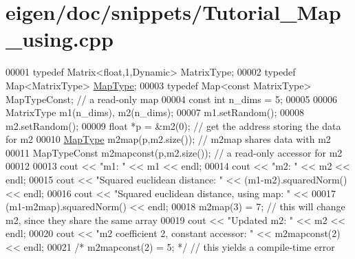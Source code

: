 \hypertarget{eigen_2doc_2snippets_2_tutorial___map__using_8cpp_source}{}\section{eigen/doc/snippets/\+Tutorial\+\_\+\+Map\+\_\+using.cpp}
\label{eigen_2doc_2snippets_2_tutorial___map__using_8cpp_source}

\begin{DoxyCode}
00001 \textcolor{keyword}{typedef} Matrix<float,1,Dynamic> MatrixType;
00002 \textcolor{keyword}{typedef} Map<MatrixType> \hyperlink{group___core___module_class_eigen_1_1_map}{MapType};
00003 \textcolor{keyword}{typedef} Map<const MatrixType> MapTypeConst;   \textcolor{comment}{// a read-only map}
00004 \textcolor{keyword}{const} \textcolor{keywordtype}{int} n\_dims = 5;
00005   
00006 MatrixType m1(n\_dims), m2(n\_dims);
00007 m1.setRandom();
00008 m2.setRandom();
00009 \textcolor{keywordtype}{float} *p = &m2(0);  \textcolor{comment}{// get the address storing the data for m2}
00010 \hyperlink{group___core___module_class_eigen_1_1_map}{MapType} m2map(p,m2.size());   \textcolor{comment}{// m2map shares data with m2}
00011 MapTypeConst m2mapconst(p,m2.size());  \textcolor{comment}{// a read-only accessor for m2}
00012 
00013 cout << \textcolor{stringliteral}{"m1: "} << m1 << endl;
00014 cout << \textcolor{stringliteral}{"m2: "} << m2 << endl;
00015 cout << \textcolor{stringliteral}{"Squared euclidean distance: "} << (m1-m2).squaredNorm() << endl;
00016 cout << \textcolor{stringliteral}{"Squared euclidean distance, using map: "} <<
00017   (m1-m2map).squaredNorm() << endl;
00018 m2map(3) = 7;   \textcolor{comment}{// this will change m2, since they share the same array}
00019 cout << \textcolor{stringliteral}{"Updated m2: "} << m2 << endl;
00020 cout << \textcolor{stringliteral}{"m2 coefficient 2, constant accessor: "} << m2mapconst(2) << endl;
00021 \textcolor{comment}{/* m2mapconst(2) = 5; */}   \textcolor{comment}{// this yields a compile-time error}
\end{DoxyCode}
